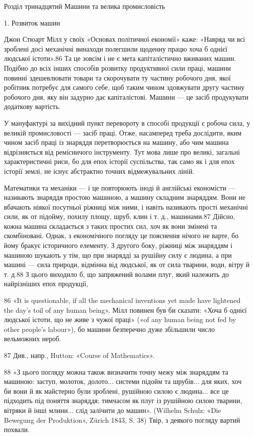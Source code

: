 Розділ тринадцятий
Машини та велика промисловість

1. Розвиток машин

Джон Стюарт Мілл у своїх «Основах політичної економії»
каже: «Навряд чи всі зроблені досі механічні винаходи полегшили
щоденну працю хоча б однієї людської істоти».86 Та це
зовсім і не є мета капіталістично вживаних машин. Подібно до
всіх інших способів розвитку продуктивної сили праці, машини
повинні здешевлювати товари та скорочувати ту частину робочого
дня, якої робітник потребує для самого себе, щоб таким
чином здовжувати другу частину робочого дня, яку він задурно
дає капіталістові. Машини — це засіб продукувати додаткову
вартість.

У мануфактурі за вихідний пункт перевороту в способі продукції
є робоча сила, у великій промисловості — засіб праці.
Отже, насамперед треба дослідити, яким чином засіб праці із
знаряддя перетворюється на машину, або чим машина відрізняється
від ремісничого інструменту. Тут мова лише про великі,
загальні характеристичні риси, бо для епох історії суспільства,
так само як і для епох історії землі, не існує абстрактно точних
відмежувальних ліній.

Математики та механіки — і це повторюють іноді й англійські
економісти — називають знаряддя простою машиною, а машину
складним знаряддям. Вони не вбачають ніякої посутньої
ріжниці між ними, і навіть називають прості механічні сили,
як от підойму, похилу площу, шруб, клин і т. д., машинами.87
Дійсно, кожна машина складається з таких простих сил,
хоч як вони змінені та скомбіновані. Однак, з економічного погляду
це пояснення нічого не варте, бо йому бракує історичного
елементу. З другого боку, ріжниці між знаряддям і машиною
шукають у тім, що при знарядді за рушійну силу є людина, а
при машині — сила природи, відмінна від людської, як от сила
тварини, води, вітру й т. д.88 З цього виходило б, що запряжений
волами плуг, який належить до найрізніших епох продукції,

86 «It is questionable, if all the mechanical inventions yet made have
lightened the day’s toil of any human being». Мілл повинен був би сказати:
«Хоча б однієї людської істоти, що не живе з чужої праці» («of any human
being not fed by other people’s labour»), бо машини безперечно дуже збільшили
число вельможних нероб.

87 Див., напр., Hutton: «Course of Mathematics».

88 «З цього погляду можна також визначити точну межу між знаряддям
та машиною: заступ, молоток, долото... системи підойм та шрубів...
для яких, хоч би вони й як майстерно були зроблені, рушійною силою є
людина... все це підходить під поняття знаряддя; тимчасом як плуг із
рушійною силою тварини, вітряки й інші млини... слід залічити до машин».
(Wilhelm Schulz: «Die Bewegung der Produktion», Zürich 1843, S. 38)
Твір, з деякого погляду вартий похвали.
